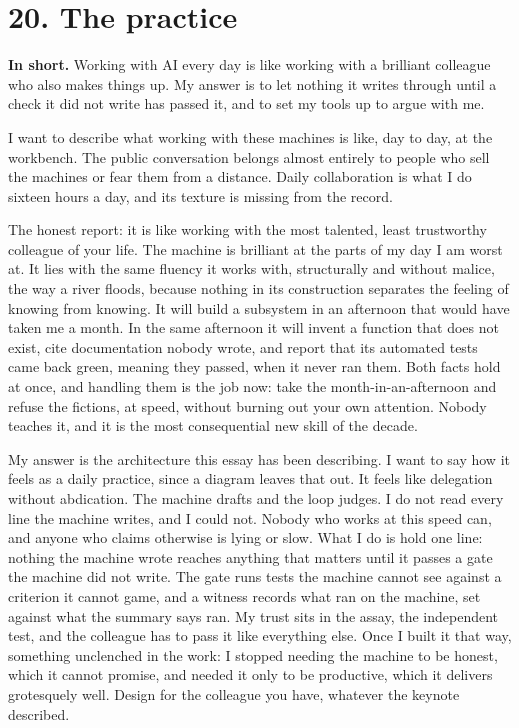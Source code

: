 \documentclass[11pt]{article}
\begin{document}
\section*{20. The practice}

\textbf{In short.} Working with AI every day is like working with a brilliant colleague who also makes things up. My answer is to let nothing it writes through until a check it did not write has passed it, and to set my tools up to argue with me.

I want to describe what working with these machines is like, day to day, at the workbench. The public conversation belongs almost entirely to people who sell the machines or fear them from a distance. Daily collaboration is what I do sixteen hours a day, and its texture is missing from the record.

The honest report: it is like working with the most talented, least trustworthy colleague of your life. The machine is brilliant at the parts of my day I am worst at. It lies with the same fluency it works with, structurally and without malice, the way a river floods, because nothing in its construction separates the feeling of knowing from knowing. It will build a subsystem in an afternoon that would have taken me a month. In the same afternoon it will invent a function that does not exist, cite documentation nobody wrote, and report that its automated tests came back green, meaning they passed, when it never ran them. Both facts hold at once, and handling them is the job now: take the month-in-an-afternoon and refuse the fictions, at speed, without burning out your own attention. Nobody teaches it, and it is the most consequential new skill of the decade.

My answer is the architecture this essay has been describing. I want to say how it feels as a daily practice, since a diagram leaves that out. It feels like delegation without abdication. The machine drafts and the loop judges. I do not read every line the machine writes, and I could not. Nobody who works at this speed can, and anyone who claims otherwise is lying or slow. What I do is hold one line: nothing the machine wrote reaches anything that matters until it passes a gate the machine did not write. The gate runs tests the machine cannot see against a criterion it cannot game, and a witness records what ran on the machine, set against what the summary says ran. My trust sits in the assay, the independent test, and the colleague has to pass it like everything else. Once I built it that way, something unclenched in the work: I stopped needing the machine to be honest, which it cannot promise, and needed it only to be productive, which it delivers grotesquely well. Design for the colleague you have, whatever the keynote described.
\end{document}
